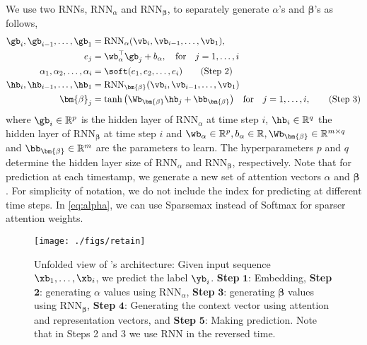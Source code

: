 We use two RNNs, $\mathrm{RNN}_{\alpha}$ and $\mathrm{RNN}_{\bm{\beta}}$, to separately generate $\alpha$'s and $\bm{\beta}$'s as follows,
\begin{align}
\gb_i, \gb_{i-1}, \ldots, \gb_1 &= \mathrm{RNN}_{\alpha}(\vb_i, \vb_{i-1}, \ldots, \vb_1), \nonumber \\
e_j &= \wb_{\alpha}^{\top} \gb_j +  b_{\alpha}, \quad \text{for} \quad j = 1, \ldots, i \label{eq:alpha} \nonumber \\
\alpha_1, \alpha_2, \ldots, \alpha_i &= \soft(e_1, e_2, \ldots, e_i) \tag{Step 2} \nonumber\\
\hb_i, \hb_{i-1}, \ldots, \hb_1 &= \mathrm{RNN}_{\bm{\beta}}(\vb_i, \vb_{i-1}, \ldots, \vb_1) \nonumber \\
\bm{\beta}_j &= \tanh\big(\Wb_{\bm{\beta}}\hb_j + \bb_{\bm{\beta}}\big)  \quad \text{for}\quad j = 1, \ldots, i, \tag{Step 3}\label{eq:beta}
\end{align}
where $\gb_i \in \mathbb{R}^{p}$ is the hidden layer of $\mathrm{RNN}_{\alpha}$ at time step $i$, $\hb_i \in \mathbb{R}^{q}$ the hidden layer of $\mathrm{RNN}_{\bm{\beta}}$ at time step $i$ and $\wb_{\alpha} \in \mathbb{R}^{p}, b_{\alpha} \in \mathbb{R}, \Wb_{\bm{\beta}} \in \mathbb{R}^{m \times q}$ and $\bb_{\bm{\beta}} \in \mathbb{R}^{m}$ are the parameters to learn. The hyperparameters $p$ and $q$ determine the hidden layer size of $\mathrm{RNN}_{\alpha}$ and $\mathrm{RNN}_{\bm{\beta}}$, respectively. Note that for prediction at each timestamp, we generate a new set of attention vectors $\alpha$ and $\bm{\beta}$. For simplicity of notation, we do not include the index for predicting at different time steps. 
In \ref{eq:alpha}, we can use Sparsemax \cite{martins2016softmax} instead of Softmax for sparser attention weights.

\begin{figure}[t]
\centering
\texttt{[image: ./figs/retain]}
\caption{Unfolded view of \alg's architecture: Given input sequence $\xb_1, \ldots, \xb_i$, we predict the label $\yb_i$. 
\textbf{Step} $\bm{1}$: Embedding, 
\textbf{Step} $\bm{2}$: generating $\alpha$ values using $\mathrm{RNN}_{\alpha}$, 
\textbf{Step} $\bm{3}$: generating $\bm{\beta}$ values using $\mathrm{RNN}_{\bm{\beta}}$, 
\textbf{Step} $\bm{4}$: Generating the context vector using attention and representation vectors, and 
\textbf{Step} $\bm{5}$: Making prediction.
Note that in Steps 2 and 3 we use RNN in the reversed time.}
\label{fig:architecture}
\end{figure}



